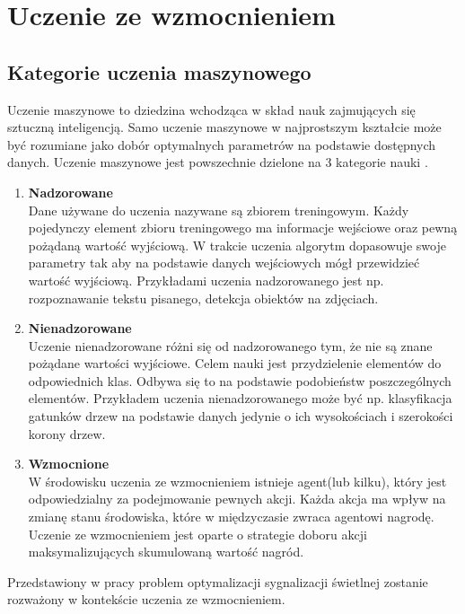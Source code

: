 \documentclass[12pt]{book}
\theoremstyle{plain}
\begin{document}
\chapter{Uczenie ze wzmocnieniem} \label{chapter:reinforcement}
\section{Kategorie uczenia maszynowego}
Uczenie maszynowe to dziedzina wchodząca w skład nauk zajmujących się sztuczną inteligencją\cite{ml_ai}. Samo uczenie maszynowe w najprostszym kształcie może być rozumiane jako dobór optymalnych parametrów na podstawie dostępnych danych. Uczenie maszynowe jest powszechnie dzielone na 3 kategorie nauki \cite{machineLearningClassification}.
\begin{enumerate}
	\item \textbf{Nadzorowane} \\
	Dane używane do uczenia nazywane są zbiorem treningowym. Każdy pojedynczy element zbioru treningowego ma informacje wejściowe oraz pewną pożądaną wartość wyjściową. W trakcie uczenia algorytm dopasowuje swoje parametry tak aby na podstawie danych wejściowych mógł przewidzieć wartość wyjściową. Przykładami uczenia nadzorowanego jest np. rozpoznawanie tekstu pisanego, detekcja obiektów na zdjęciach.
	\item \textbf{Nienadzorowane} \\
	Uczenie nienadzorowane różni się od nadzorowanego tym, że nie  są znane pożądane wartości wyjściowe. Celem nauki jest przydzielenie elementów do odpowiednich klas. Odbywa się to na podstawie podobieństw poszczególnych elementów. Przykładem uczenia nienadzorowanego może być np. klasyfikacja gatunków drzew na podstawie danych jedynie o ich wysokościach i szerokości korony drzew.
	\item \textbf{Wzmocnione} \\
	W środowisku uczenia ze wzmocnieniem istnieje agent(lub kilku), który jest odpowiedzialny za podejmowanie pewnych akcji. Każda akcja ma wpływ na zmianę stanu środowiska, które w międzyczasie zwraca agentowi nagrodę. Uczenie ze wzmocnieniem jest oparte o strategie doboru akcji maksymalizujących skumulowaną wartość nagród.
\end{enumerate}
Przedstawiony w pracy problem optymalizacji sygnalizacji świetlnej zostanie rozważony w kontekście uczenia ze wzmocnieniem.
\end{document}
